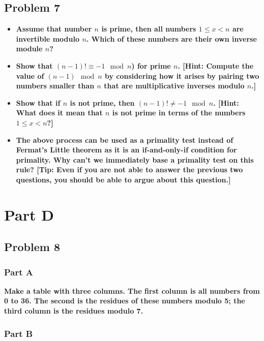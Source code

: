 \documentclass[11pt]{article}
\begin{document}
\subsection*{Problem 7}

\begin{itemize}

\item \textbf{Assume that number $n$ is prime, then all numbers $1 \leq x < n$
  are invertible modulo $n$. Which of these numbers are their own
  inverse module $n$?}

\item \textbf{Show that $(n-1)! \equiv -1 \mod n$) for prime $n$. [Hint:
  Compute the value of $(n-1) \mod n$ by considering how it arises by
  pairing two numbers smaller than $n$ that are multiplicative
  inverses modulo $n$.]}

\item \textbf{Show that if $n$ is not prime, then $(n-1)! \neq -1 \mod
  n$. [Hint: What does it mean that $n$ is not prime in terms of the
    numbers $1 \leq x < n$?]}

\item \textbf{The above process can be used as a primality test instead of
  Fermat's Little theorem as it is an if-and-only-if condition for
  primality. Why can't we immediately base a primality test on this
  rule? [Tip: Even if you are not able to answer the previous two
    questions, you should be able to argue about this question.]}

\end{itemize}

\section*{Part D}

\subsection*{Problem 8}

\subsubsection*{Part A} 

\textbf{Make a table with three columns. The first column is all numbers
from 0 to 36. The second is the residues of these numbers modulo 5;
the third column is the residues modulo 7.}

\subsubsection*{Part B} 
\end{document}
